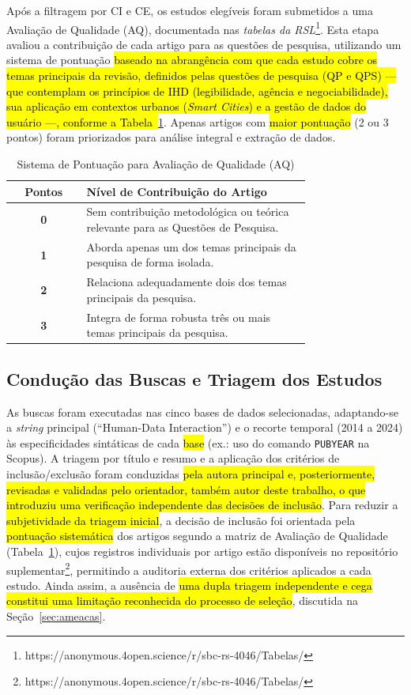 \documentclass[12pt]{article}
\begin{document}
Após a filtragem por CI e CE, os estudos elegíveis foram submetidos a uma Avaliação de Qualidade (AQ), documentada nas \emph{tabelas da RSL}\footnote{https://anonymous.4open.science/r/sbc-rs-4046/Tabelas/}. Esta etapa avaliou a contribuição de cada artigo para as questões de pesquisa, utilizando um sistema de pontuação \hl{baseado na abrangência com que cada estudo cobre os temas principais da revisão, definidos pelas questões de pesquisa (QP e QPS) --- que contemplam os princípios de IHD (legibilidade, agência e negociabilidade), sua aplicação em contextos urbanos (\textit{Smart Cities}) e a gestão de dados do usuário ---, conforme a Tabela~}\ref{tab:qualidade}. Apenas artigos com \hl{maior pontuação} (2 ou 3 pontos) foram priorizados para análise integral e extração de dados.

\begin{table}[H]
\centering
\caption{Sistema de Pontuação para Avaliação de Qualidade (AQ)}
\label{tab:qualidade}
\small
\begin{tabular}{c p{0.75\linewidth}}
\hline
\textbf{Pontos} & \textbf{Nível de Contribuição do Artigo} \\ 
\hline
\textbf{0} & Sem contribuição metodológica ou teórica relevante para as Questões de Pesquisa. \\ 
\hline
\textbf{1} & Aborda apenas um dos temas principais da pesquisa de forma isolada. \\ 
\hline
\textbf{2} & Relaciona adequadamente dois dos temas principais da pesquisa. \\ 
\hline
\textbf{3} & Integra de forma robusta três ou mais temas principais da pesquisa. \\ 
\hline
\end{tabular}
\end{table}

\subsection{Condução das Buscas e Triagem dos Estudos}

As buscas foram executadas nas cinco bases de dados selecionadas, adaptando-se a \textit{string} principal (``Human-Data Interaction'') e o recorte temporal (2014 a 2024) às especificidades sintáticas de cada \hl{base} (ex.: uso do comando \texttt{PUBYEAR} na Scopus). A triagem por título e resumo e a aplicação dos critérios de inclusão/exclusão foram conduzidas \hl{pela autora principal e, posteriormente, revisadas e validadas pelo orientador, também autor deste trabalho, o que introduziu uma verificação independente das decisões de inclusão}. Para reduzir a \hl{subjetividade da triagem inicial}, a decisão de inclusão foi orientada pela \hl{pontuação sistemática} dos artigos segundo a matriz de Avaliação de Qualidade (Tabela~\ref{tab:qualidade}), cujos registros individuais por artigo estão disponíveis no repositório suplementar\footnote{https://anonymous.4open.science/r/sbc-rs-4046/Tabelas/}, permitindo a auditoria externa dos critérios aplicados a cada estudo. Ainda assim, a ausência de \hl{uma dupla triagem independente e cega constitui uma limitação reconhecida do processo de seleção}, discutida na Seção~\ref{sec:ameacas}.
\end{document}
